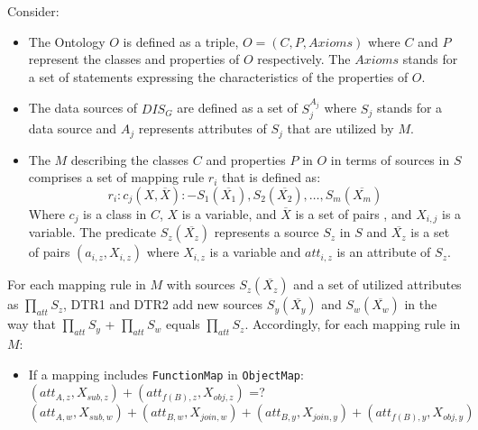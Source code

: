 Consider:
\begin{itemize}
    \item The Ontology $O$ is defined as a triple, $O=(C,P,Axioms)$ where $C$ and $P$ represent the classes and properties of $O$ respectively. The $Axioms$ stands for a set of statements expressing the characteristics of the properties of $O$.  
    \item The data sources of $DIS_G$ are defined as a set of $S_j^{A_j}$ where $S_j$ stands for a data source and $A_j$ represents attributes of $S_j$ that are utilized by $M$.
    \item The $M$ describing the classes $C$ and properties $P$ in $O$ in terms of sources in $S$ comprises a set of mapping rule $r_i$ that is defined as:
        \[r_i :  c_j(X,\overline{X}) : - S_1(\overline{X_1}), S_2(\overline{X_2}),\dots, S_m(\overline{X_m}) \]
    Where $c_j$ is a class in $C$, $X$ is a variable, and $\overline{X}$ is a set of pairs , and $X_{i,j}$ is a variable. The predicate $S_z(\overline{X_z})$ represents a source $S_z$ in $S$ and $\overline{X_z}$ is a set of pairs $(a_{i,z},X_{i,z})$ where $X_{i,z}$ is a variable and $att_{i,z}$ is an attribute of $S_z$. 
\end{itemize}
For each mapping rule in $M$ with sources $S_z(\overline{X_z})$ and a set of utilized attributes as $\prod_{att}S_z$, DTR1 and DTR2 add new sources $S_y(\overline{X_y})$ and $S_w(\overline{X_w})$ in the way that $\prod_{att}S_y$ + $\prod_{att}S_w$ equals $\prod_{att}S_z$. Accordingly, for each mapping rule in $M$:
\begin{itemize}
    \item If a mapping includes \verb|FunctionMap| in \verb|ObjectMap|:\\
    $(att_{A,z},X_{sub,z})+(att_{f(B),z},X_{obj,z})$ =? 
    $(att_{A,w},X_{sub,w})+(att_{B,w},X_{join,w})+(att_{B,y
    },X_{join,y})+(att_{f(B),y},X_{obj,y})$
\end{itemize}



